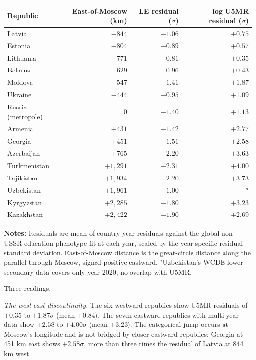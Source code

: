 \documentclass[12pt,letterpaper]{article}
\begin{document}
{\small\setlength{\tabcolsep}{4pt}
\begin{longtable}[]{@{}lrrr@{}}
\toprule
Republic & East-of-Moscow (km) & LE residual ($\sigma$) & log U5MR residual ($\sigma$) \\
\midrule
\endhead
Latvia            & $-844$  & $-1.06$ & $+0.75$ \\
Estonia           & $-804$  & $-0.89$ & $+0.57$ \\
Lithuania         & $-771$  & $-0.81$ & $+0.35$ \\
Belarus           & $-629$  & $-0.96$ & $+0.43$ \\
Moldova           & $-547$  & $-1.41$ & $+1.87$ \\
Ukraine           & $-444$  & $-0.95$ & $+1.09$ \\
Russia (metropole) & $0$    & $-1.40$ & $+1.13$ \\
Armenia           & $+431$  & $-1.42$ & $+2.77$ \\
Georgia           & $+451$  & $-1.51$ & $+2.58$ \\
Azerbaijan        & $+765$  & $-2.20$ & $+3.63$ \\
Turkmenistan      & $+1{,}291$ & $-2.31$ & $+4.00$ \\
Tajikistan        & $+1{,}934$ & $-2.20$ & $+3.73$ \\
Uzbekistan        & $+1{,}961$ & $-1.00$ & $-{}^{a}$ \\
Kyrgyzstan        & $+2{,}285$ & $-1.80$ & $+3.23$ \\
Kazakhstan        & $+2{,}422$ & $-1.90$ & $+2.69$ \\
\bottomrule
\end{longtable}}

\begin{minipage}{\dimexpr\textwidth-2em}
\scriptsize
\textbf{Notes:} Residuals are mean of country-year residuals against
the global non-USSR education-phenotype fit at each year, scaled by
the year-specific residual standard deviation. East-of-Moscow distance
is the great-circle distance along the parallel through Moscow,
signed positive eastward. $^{a}$Uzbekistan's WCDE lower-secondary
data covers only year 2020, no overlap with U5MR.
\end{minipage}

Three readings.

\textit{The west-east discontinuity.} The six westward republics
show U5MR residuals of $+0.35$ to $+1.87\sigma$ (mean $+0.84$). The
seven eastward republics with multi-year data show $+2.58$ to
$+4.00\sigma$ (mean $+3.23$). The categorical jump occurs at Moscow's
longitude and is not bridged by closer eastward republics: Georgia at
451 km east shows $+2.58\sigma$, more than three times the residual
of Latvia at 844 km west.
\end{document}
